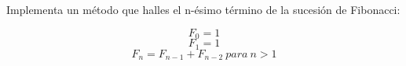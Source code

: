 Implementa un método que halles el n-ésimo término de la sucesión de Fibonacci:

\[ F_0 = 1 \]
\[ F_1 = 1 \]
\[ F_n = F_{n-1} + F_{n-2} ~ para ~ n > 1 \]

